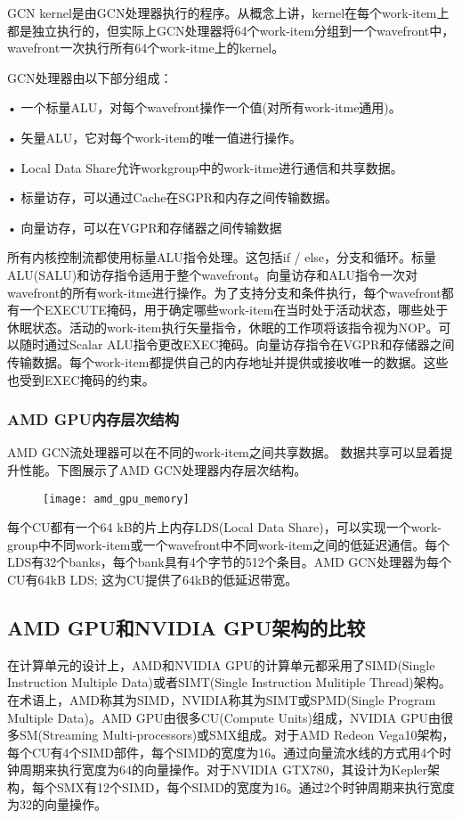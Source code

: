 GCN kernel是由GCN处理器执行的程序。从概念上讲，kernel在每个work-item上都是独立执行的，但实际上GCN处理器将64个work-item分组到一个wavefront中，wavefront一次执行所有64个work-itme上的kernel。

GCN处理器由以下部分组成：

•	一个标量ALU，对每个wavefront操作一个值(对所有work-itme通用)。

•	矢量ALU，它对每个work-item的唯一值进行操作。

•	Local Data Share允许workgroup中的work-itme进行通信和共享数据。

•	标量访存，可以通过Cache在SGPR和内存之间传输数据。

•	向量访存，可以在VGPR和存储器之间传输数据

所有内核控制流都使用标量ALU指令处理。这包括if / else，分支和循环。标量ALU(SALU)和访存指令适用于整个wavefront。向量访存和ALU指令一次对wavefront的所有work-itme进行操作。为了支持分支和条件执行，每个wavefront都有一个EXECUTE掩码，用于确定哪些work-item在当时处于活动状态，哪些处于休眠状态。活动的work-item执行矢量指令，休眠的工作项将该指令视为NOP。可以随时通过Scalar ALU指令更改EXEC掩码。向量访存指令在VGPR和存储器之间传输数据。每个work-item都提供自己的内存地址并提供或接收唯一的数据。这些也受到EXEC掩码的约束。

\subsubsection{AMD GPU内存层次结构}
AMD GCN流处理器可以在不同的work-item之间共享数据。 数据共享可以显着提升性能。下图展示了AMD GCN处理器内存层次结构。
\begin{figure}[htbp]
	\centering
	\texttt{[image: amd\_gpu\_memory]}
	\label{fig:amd_gpu_memory}
\end{figure}
每个CU都有一个64 kB的片上内存LDS(Local Data Share)，可以实现一个work-group中不同work-item或一个wavefront中不同work-item之间的低延迟通信。每个LDS有32个banks，每个bank具有4个字节的512个条目。AMD GCN处理器为每个CU有64kB LDS; 这为CU提供了64kB的低延迟带宽。


\subsection{AMD GPU和NVIDIA GPU架构的比较}
在计算单元的设计上，AMD和NVIDIA GPU的计算单元都采用了SIMD(Single Instruction Multiple Data)或者SIMT(Single Instruction Mulitiple Thread)架构。在术语上，AMD称其为SIMD，NVIDIA称其为SIMT或SPMD(Single Program Multiple Data)。AMD GPU由很多CU(Compute Units)组成，NVIDIA GPU由很多SM(Streaming Multi-processors)或SMX组成。对于AMD Redeon Vega10架构，每个CU有4个SIMD部件，每个SIMD的宽度为16。通过向量流水线的方式用4个时钟周期来执行宽度为64的向量操作。对于NVIDIA GTX780，其设计为Kepler架构，每个SMX有12个SIMD，每个SIMD的宽度为16。通过2个时钟周期来执行宽度为32的向量操作。

